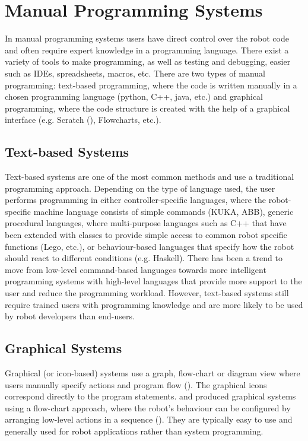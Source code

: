 \section{Manual Programming Systems}\label{subsec:Manual Programming Systems}
In manual programming systems users have direct control over the robot code
and often require expert knowledge in a programming language. %
There exist a variety of tools to make programming, as well as testing and debugging, easier such as IDEs, spreadsheets, macros, etc.
There are two types of manual programming: text-based programming, where the code is written manually in a chosen programming language (python, C++, java, etc.) and graphical programming, where the code structure is created with the help of a graphical interface (e.g. Scratch (\cite{majed2014learn}), Flowcharts, etc.). 

\subsection{Text-based Systems}\label{sssec:Text-based Systems}
Text-based systems are one of the most common methods and use a traditional programming approach. 
Depending on the type of language used, the user performs programming in either controller-specific languages, where the robot-specific machine language consists of simple commands ({KUKA, ABB}), generic procedural languages, where multi-purpose languages such as C++ that have been extended with classes to provide simple access to common robot specific functions ({Lego, etc.}), or behaviour-based languages that specify how the robot should react to different conditions (e.g. Haskell). 
There has been a trend to move from low-level command-based languages towards more intelligent programming systems with high-level languages that provide more support to the user and reduce the programming workload.
However, text-based systems still require trained users with programming knowledge and are more likely to be used by robot developers than end-users.



\subsection{Graphical Systems}\label{sssec:Graphical systems}
Graphical (or icon-based) systems use a graph, flow-chart or diagram view where users manually specify actions and program flow ().
The graphical icons correspond directly to the program statements.
\cite{lego2003} and \cite{bischoff2002morpha} produced graphical systems using a flow-chart approach, where the robot's behaviour can be configured by arranging low-level actions in a sequence ().
They are typically easy to use and generally used for robot applications rather than system programming. 


